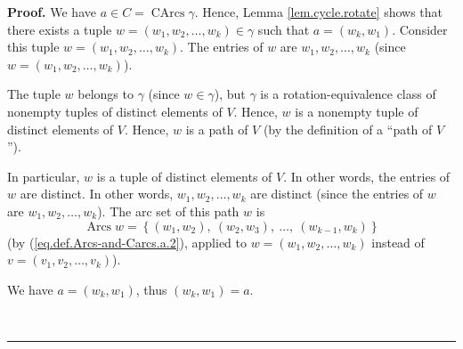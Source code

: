 \documentclass[numbers=enddot,12pt,final,onecolumn,notitlepage]{scrartcl}%
\numberwithin{exer}{section}
\theoremstyle{definition}
\newenvironment{proof}[1][Proof]{\noindent\textbf{#1.} }{\ \rule{0.5em}{0.5em}}
\newenvironment{verlong}{}{}
\begin{document}
\begin{verlong}
\begin{proof}
We have $a\in C=\operatorname*{CArcs}\gamma$. Hence, Lemma
\ref{lem.cycle.rotate} shows that there exists a tuple $w=\left(  w_{1}%
,w_{2},\ldots,w_{k}\right)  \in\gamma$ such that $a=\left(  w_{k}%
,w_{1}\right)  $. Consider this tuple $w=\left(  w_{1},w_{2},\ldots
,w_{k}\right)  $. The entries of $w$ are $w_{1},w_{2},\ldots,w_{k}$ (since
$w=\left(  w_{1},w_{2},\ldots,w_{k}\right)  $).

The tuple $w$ belongs to $\gamma$ (since $w\in\gamma$), but $\gamma$ is a
rotation-equivalence class of nonempty tuples of distinct elements of $V$.
Hence, $w$ is a nonempty tuple of distinct elements of $V$. Hence, $w$ is a
path of $V$ (by the definition of a \textquotedblleft path of $V$%
\textquotedblright).

In particular, $w$ is a tuple of distinct elements of $V$. In other words, the
entries of $w$ are distinct. In other words, $w_{1},w_{2},\ldots,w_{k}$ are
distinct (since the entries of $w$ are $w_{1},w_{2},\ldots,w_{k}$). The arc
set of this path $w$ is%
\begin{equation}
\operatorname*{Arcs}w=\left\{  \left(  w_{1},w_{2}\right)  ,\ \left(
w_{2},w_{3}\right)  ,\ \ldots,\ \left(  w_{k-1},w_{k}\right)  \right\}
\label{pf.lem.carcs.linear1.b.1}%
\end{equation}
(by (\ref{eq.def.Arcs-and-Carcs.a.2}), applied to $w=\left(  w_{1}%
,w_{2},\ldots,w_{k}\right)  $ instead of $v=\left(  v_{1},v_{2},\ldots
,v_{k}\right)  $).

We have $a=\left(  w_{k},w_{1}\right)  $, thus $\left(  w_{k},w_{1}\right)
=a$.


\end{proof}
\end{verlong}
\end{document}
